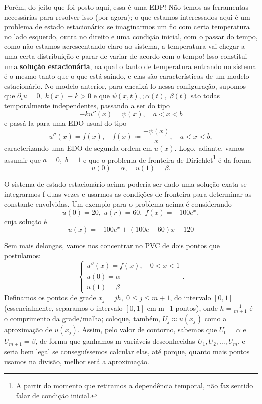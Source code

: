 \documentclass[../differential_methods.tex]{subfiles}
\begin{document}
Porém, do jeito que foi posto aqui, essa é uma EDP! Não temos as ferramentas necessárias para resolver isso (por agora); o que estamos interessados aqui é um problema de estado estacionário: se imaginarmos um fio com certa temperatura no lado esquerdo, outra no direito e uma condição inicial, com o passar do tempo, como não estamos acrescentando claro ao sistema, a temperatura vai chegar a uma certa distribuição e parar de variar de acordo com o tempo! Isso constitui uma \textbf{solução estacionária}, na qual o tanto de temperatura entrando no sistema é o mesmo tanto que o que está saindo, e elas são características de um modelo estacionário.
No modelo anterior, para encaixá-lo nessa configuração, supomos que \(\partial_{t}u = 0, \; k(x)\equiv k >0 \) e que \(\psi (x, t),; \alpha (t),\; \beta (t)\) são todas temporalmente independentes, passando a ser do tipo
\[
	-k u''(x) = \psi (x),\quad a < x < b
\]
e passá-la para uma EDO usual do tipo
\[
	u''(x) = f(x),\quad f(x)\coloneqq \frac{-\psi (x)}{x},\quad a<x<b,
\]
caracterizando uma EDO de segunda ordem em \(u(x).\) Logo, adiante, vamos assumir que \(a=0, \; b=1\) e que o problema de fronteira de Dirichlet\footnote{A partir do momento que retiramos a dependência temporal, não faz sentido falar de condição inicial.} é da forma
\[
	u(0)=\alpha ,\quad u(1)=\beta.
\]
\begin{tcolorbox}[
		skin=enhanced,
		title=Observação,
		fonttitle=\bfseries,
		colframe=black,
		colbacktitle=cyan!75!white,
		colback=cyan!15,
		colbacklower=black,
		coltitle=black,
		drop fuzzy shadow,
	]
	O sistema de estado estacionário acima poderia ser dado uma solução exata se integrarmos f duas vezes e usarmos as condições de fronteira para determinar as constante envolvidas.
	Um exemplo para o problema acima é considerando
	\[
		u(0)=20,\; u(r)=60,\; f(x)=-100e^{x},
	\]
	cuja solução é
	\[
		u(x)=-100e^{x} + (100e -60)x +120
	\]
\end{tcolorbox}

Sem mais delongas, vamos nos concentrar no PVC de dois pontos que postulamos:
\[
	\left\{\begin{array}{ll}
		u''(x)=f(x),\quad 0<x<1 \\
		u(0)=\alpha             \\
		u(1)=\beta
	\end{array}\right..
\]
Definamos os pontos de grade \(x_{j}=jh,\; 0\leq j\leq m+1\), do intervalo \([0,1]\) (essencialmente, separamos o intervalo \([0,1]\) em m+1 pontos), onde \(h=\frac{1}{m+1}\) é o comprimento da grade/malha; coloque, também, \(U_{j}\approx u(x_{j})\) como a aproximação de \(u(x_{j})\).
Assim, pelo valor de contorno, sabemos que \(U_{0}=\alpha \) e \(U_{m+1}=\beta \), de forma que ganhamos m variáveis desconhecidas \(U_1, U_2, \dotsc , U_{m}\), e seria bem legal se conseguíssemos calcular elas, até porque, quanto mais pontos usamos na divisão, melhor será a aproximação.
\end{document}
